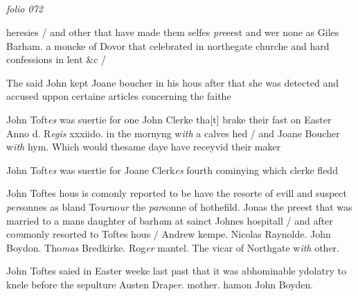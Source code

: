 \documentclass[12pt, a4paper]{book}
\begin{document}
\dotfill
					  \subsection*{}  \subsection*{}

\textit{folio 072}



		\ifthenelse{\isodd{\thepage}}
		{\reversemarginpar}
		{\normalmarginpar}
		heresies / and other that have made them selfes \textit{pre}eest
 and wer none as Giles Barham. a moncke of
 	Dovor that celebrated in northegate churche and
 hard confessions in lent \&c /
 
		\ifthenelse{\isodd{\thepage}}
		{\reversemarginpar}
		{\normalmarginpar}
		The said John kept Joane boucher in his hous
 after that she was detected and accused uppon
 certaine articles concerning the faithe
	
		\ifthenelse{\isodd{\thepage}}
		{\reversemarginpar}
		{\normalmarginpar}
		John Toft\textit{es} was suertie for one John Clerke tha[t]
 brake their fast on Easter Anno d. R\textit{egis} xxxiido.
		in the mornyng w\textit{ith} a calves hed / and Joane
 Boucher w\textit{ith} hym. Which would thesame daye have
	receyvid their maker
	
		\ifthenelse{\isodd{\thepage}}
		{\reversemarginpar}
		{\normalmarginpar}
		John Toft\textit{es} was suertie for Joane Clerk\textit{es} fourth
 cominying which clerke fledd
	
		\ifthenelse{\isodd{\thepage}}
		{\reversemarginpar}
		{\normalmarginpar}
		John Toftes hous is comonly reported to be have
		the resorte of evill and suspect \textit{per}sonnes as bland
		To\textit{ur}no\textit{ur} the \textit{par}sonne of hothefild. Jonas the preest
		that was married to a mans daughter of barh\textit{a}m
 at sainct Johnes hospitall / and after co\textit{m}monly
		resorted to Toftes hous / Andrew kempe. Nicolas
			Raynolde. John Boydon. Tho\textit{mas} Bredkirke. Rog\textit{er} mantel. The
 vicar of Northgate w\textit{ith} other.
	 
			 
		\ifthenelse{\isodd{\thepage}}
		{\reversemarginpar}
		{\normalmarginpar}
		John Toftes saied in Easter weeke last past
 that it was abhominable ydolatry to knele
		before the sepulture Austen Dra\textit{per}. mother. hamon
		John Boyden.
	
\end{document}
